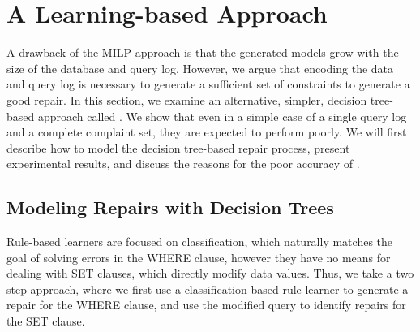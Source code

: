 
\appendix

\section{A Learning-based Approach}
\label{sec:heuristic}
  
A drawback of the MILP approach is that the generated models grow with the 
size of the database and query log.
However, we argue that encoding the data and query log is necessary to generate a sufficient set of constraints to generate a good repair.
In this section, we examine an alternative, simpler, decision tree-based approach called \dt. 
We show that even in a simple case of a single query log and a complete complaint set, they are expected to perform poorly.
We will first describe how to model the decision tree-based repair process, 
present experimental results, and discuss the reasons for the poor accuracy of \dt.


\subsection{Modeling Repairs with Decision Trees}


 Rule-based learners are focused on classification, which naturally matches the goal of solving 
errors in the WHERE clause, however they have no means for dealing with SET clauses, which directly modify data values.
Thus, we take a two step approach, where we first use a classification-based rule learner to generate a repair for the WHERE clause,
and use the modified query to identify repairs for the SET clause.

